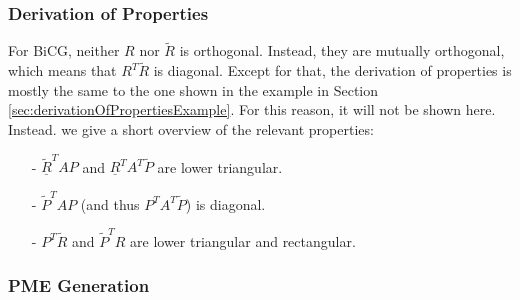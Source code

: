 \subsubsection{Derivation of Properties}

For BiCG, neither $R$ nor $\tilde{R}$ is orthogonal. Instead, they are mutually orthogonal, which means that $R^T \tilde{R}$ is diagonal. Except for that, the derivation of properties is mostly the same to the one shown in the example in Section \ref{sec:derivationOfPropertiesExample}. For this reason, it will not be shown here. Instead. we give a short overview of the relevant properties: 
%
\begin{itemize}
\item[-] $\underline{\tilde{R}}^T A P$ and $\underline{R}^T A^T \tilde{P}$ are lower triangular.
\item[-] $\tilde{P}^T A P$ (and thus $P^T A^T \tilde{P}$) is diagonal.
\item[-] $P^T \tilde{R}$ and $\tilde{P}^T R$ are lower triangular and rectangular.
\end{itemize}
%
%
%
\subsubsection{PME Generation}

